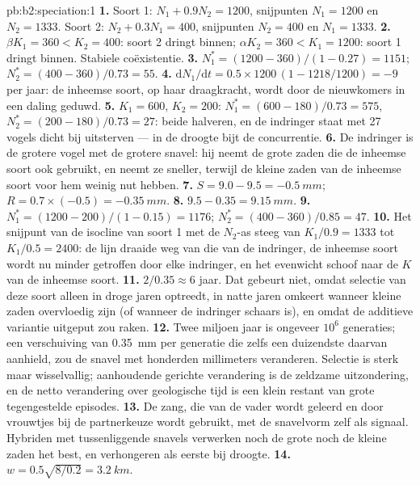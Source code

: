 \begin{solution}{pb:b2:speciation:1}
\textbf{1.} Soort 1: $N_1 + 0.9N_2 = 1200$, snijpunten $N_1 = 1200$
en $N_2 = 1333$. Soort 2: $N_2 + 0.3N_1 = 400$, snijpunten $N_2 =
400$ en $N_1 = 1333$.
\textbf{2.} $\beta K_1 = 360 < K_2 = 400$: soort 2 dringt binnen;
$\alpha K_2 = 360 < K_1 = 1200$: soort 1 dringt binnen. Stabiele
coëxistentie.
\textbf{3.} $N_1^{*} = (1200 - 360)/(1 - 0.27) = 1151$; $N_2^{*} =
(400 - 360)/0.73 = 55$.
\textbf{4.} $\mathrm{d}N_1/\mathrm{d}t = 0.5\times 1200\,(1 - 1218/1200)
= -9$ per jaar: de inheemse soort, op haar draagkracht, wordt door de
nieuwkomers in een daling geduwd.
\textbf{5.} $K_1 = 600$, $K_2 = 200$: $N_1^{*} = (600 - 180)/0.73 =
575$, $N_2^{*} = (200 - 180)/0.73 = 27$: beide halveren, en de indringer
staat met 27 vogels dicht bij uitsterven --- in de droogte bijt de
concurrentie.
\textbf{6.} De indringer is de grotere vogel met de grotere snavel: hij
neemt de grote zaden die de inheemse soort ook gebruikt, en neemt ze
sneller, terwijl de kleine zaden van de inheemse soort voor hem weinig nut
hebben.
\textbf{7.} $S = 9.0 - 9.5 = \qty{-0.5}{mm}$; $R = 0.7\times(-0.5) =
\qty{-0.35}{mm}$.
\textbf{8.} $9.5 - 0.35 = \qty{9.15}{mm}$.
\textbf{9.} $N_1^{*} = (1200 - 200)/(1 - 0.15) = 1176$; $N_2^{*} =
(400 - 360)/0.85 = 47$.
\textbf{10.} Het snijpunt van de isocline van soort 1 met de $N_2$-as steeg van
$K_1/0.9 = 1333$ tot $K_1/0.5 = 2400$: de lijn draaide weg van die
van de indringer, de inheemse soort wordt nu minder getroffen door elke
indringer, en het evenwicht schoof naar de $K$ van de inheemse soort.
\textbf{11.} $2/0.35 \approx 6$ jaar. Dat gebeurt niet, omdat selectie
van deze soort alleen in droge jaren optreedt, in natte jaren omkeert
wanneer kleine zaden overvloedig zijn (of wanneer de indringer schaars is), en
omdat de additieve variantie uitgeput zou raken.
\textbf{12.} Twee miljoen jaar is ongeveer $10^{6}$ generaties; een
verschuiving van \qty{0.35}{mm} per generatie die zelfs een duizendste
daarvan aanhield, zou de snavel met honderden millimeters veranderen. Selectie
is sterk maar wisselvallig; aanhoudende gerichte verandering is de zeldzame
uitzondering, en de netto verandering over geologische tijd is een klein
restant van grote tegengestelde episodes.
\textbf{13.} De zang, die van de vader wordt geleerd en door vrouwtjes bij de
partnerkeuze wordt gebruikt, met de snavelvorm zelf als signaal. Hybriden met
tussenliggende snavels verwerken noch de grote noch de kleine zaden het best,
en verhongeren als eerste bij droogte.
\textbf{14.} $w = 0.5\sqrt{8/0.2} = \qty{3.2}{km}$.

\end{solution}
